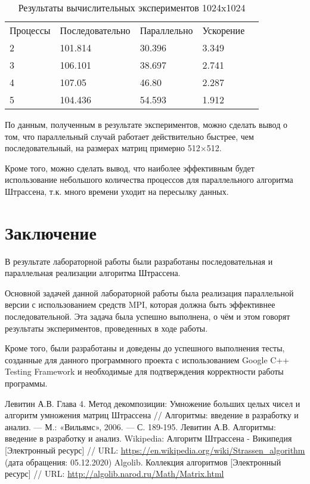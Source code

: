 \documentclass{report}
\begin{document}
\begin{table}[!h]
\caption{Результаты вычислительных экспериментов 1024x1024}
\centering
\begin{tabular}{lllll}
Процессы & Последовательно & Параллельно & Ускорение   \\
2        & 101.814         & 30.396      & 3.349        \\
3        & 106.101         & 38.697      & 2.741       \\
4        & 107.05          & 46.80       & 2.287       \\
5        & 104.436         & 54.593      & 1.912       \\
\end{tabular}
\end{table}
\par По данным, полученным в результате экспериментов, можно сделать вывод о том, что параллельный случай работает действительно быстрее, чем последовательный, на размерах матриц примерно 512$\times$512. 
\par Кроме того, можно сделать вывод, что наиболее эффективным будет использование небольшого количества процессов для параллельного алгоритма Штрассена, т.к. много времени уходит на пересылку данных.
\newpage

\section*{Заключение}
В результате лабораторной работы были разработаны последовательная и параллельная реализации алгоритма Штрассена.
\par Основной задачей данной лабораторной работы была реализация параллельной версии с использованием средств MPI, которая должна быть эффективнее последовательной. Эта задача была успешно выполнена, о чём и этом говорят результаты экспериментов, проведенных в ходе работы. 
\par Кроме того, были разработаны и доведены до успешного выполнения тесты, созданные для данного программного проекта с использованием Google C++ Testing Framework и необходимые для подтверждения корректности работы программы.
\newpage

\begin{thebibliography}{1}
 Левитин А.В. Глава 4. Метод декомпозиции: Умножение больших целых чисел и алгоритм умножения матриц Штрассена // Алгоритмы: введение в разработку и анализ. — М.: «Вильямс», 2006. — С. 189-195. 
Левитин А.В. Алгоритмы: введение в разработку и анализ.
 Wikipedia: Алгоритм Штрассена - Википедия [Электронный ресурс] // URL: \url {https://en.wikipedia.org/wiki/Strassen_algorithm} (дата обращения: 05.12.2020)
 Algolib. Коллекция алгоритмов [Электронный ресурс] // URL: \url {http://algolib.narod.ru/Math/Matrix.html}

\end{thebibliography}
\newpage
\end{document}
